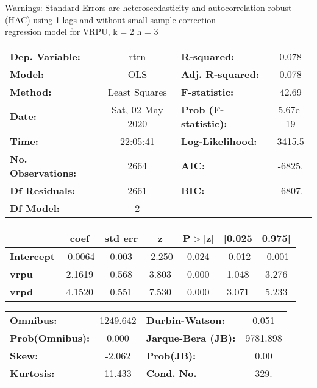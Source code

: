 Warnings: \newline
 [1] Standard Errors are heteroscedasticity and autocorrelation robust (HAC) using 1 lags and without small sample correction\\ 

regression model for VRPU, k = 2 h = 3\begin{center}
\begin{tabular}{lclc}
\toprule
\textbf{Dep. Variable:}    &       rtrn       & \textbf{  R-squared:         } &     0.078   \\
\textbf{Model:}            &       OLS        & \textbf{  Adj. R-squared:    } &     0.078   \\
\textbf{Method:}           &  Least Squares   & \textbf{  F-statistic:       } &     42.69   \\
\textbf{Date:}             & Sat, 02 May 2020 & \textbf{  Prob (F-statistic):} &  5.67e-19   \\
\textbf{Time:}             &     22:05:41     & \textbf{  Log-Likelihood:    } &    3415.5   \\
\textbf{No. Observations:} &        2664      & \textbf{  AIC:               } &    -6825.   \\
\textbf{Df Residuals:}     &        2661      & \textbf{  BIC:               } &    -6807.   \\
\textbf{Df Model:}         &           2      & \textbf{                     } &             \\
\bottomrule
\end{tabular}
\begin{tabular}{lcccccc}
                   & \textbf{coef} & \textbf{std err} & \textbf{z} & \textbf{P$> |$z$|$} & \textbf{[0.025} & \textbf{0.975]}  \\
\midrule
\textbf{Intercept} &      -0.0064  &        0.003     &    -2.250  &         0.024        &       -0.012    &       -0.001     \\
\textbf{vrpu}      &       2.1619  &        0.568     &     3.803  &         0.000        &        1.048    &        3.276     \\
\textbf{vrpd}      &       4.1520  &        0.551     &     7.530  &         0.000        &        3.071    &        5.233     \\
\bottomrule
\end{tabular}
\begin{tabular}{lclc}
\textbf{Omnibus:}       & 1249.642 & \textbf{  Durbin-Watson:     } &    0.051  \\
\textbf{Prob(Omnibus):} &   0.000  & \textbf{  Jarque-Bera (JB):  } & 9781.898  \\
\textbf{Skew:}          &  -2.062  & \textbf{  Prob(JB):          } &     0.00  \\
\textbf{Kurtosis:}      &  11.433  & \textbf{  Cond. No.          } &     329.  \\
\bottomrule
\end{tabular}
\end{center}

